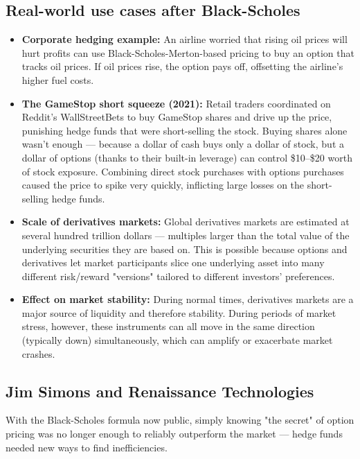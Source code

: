 \documentclass[12pt,openany]{book}
\theoremstyle{definition}
\theoremstyle{remark}
\begin{document}
\subsection{Real-world use cases after Black-Scholes}

\begin{itemize}
\item \textbf{Corporate hedging example:} An airline worried that rising oil prices will hurt profits can use Black-Scholes-Merton-based pricing to buy an option that tracks oil prices. If oil prices rise, the option pays off, offsetting the airline's higher fuel costs.


\item \textbf{The GameStop short squeeze (2021):} Retail traders coordinated on Reddit's WallStreetBets to buy GameStop shares and drive up the price, punishing hedge funds that were short-selling the stock. Buying shares alone wasn't enough --- because a dollar of cash buys only a dollar of stock, but a dollar of options (thanks to their built-in leverage) can control \$10--\$20 worth of stock exposure. Combining direct stock purchases with options purchases caused the price to spike very quickly, inflicting large losses on the short-selling hedge funds.


\item \textbf{Scale of derivatives markets:} Global derivatives markets are estimated at several hundred trillion dollars --- multiples larger than the total value of the underlying securities they are based on. This is possible because options and derivatives let market participants slice one underlying asset into many different risk/reward "versions" tailored to different investors' preferences.


\item \textbf{Effect on market stability:} During normal times, derivatives markets are a major source of liquidity and therefore stability. During periods of market stress, however, these instruments can all move in the same direction (typically down) simultaneously, which can amplify or exacerbate market crashes.


\end{itemize}

\subsection{Jim Simons and Renaissance Technologies}

With the Black-Scholes formula now public, simply knowing "the secret" of option pricing was no longer enough to reliably outperform the market --- hedge funds needed new ways to find inefficiencies.
\end{document}
